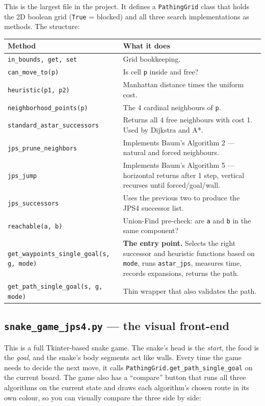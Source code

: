 \documentclass[11pt,a4paper]{article}
\begin{document}
This is the largest file in the project. It defines a \texttt{PathingGrid} class that holds the 2D boolean grid (\texttt{True} = blocked) and all three search implementations as methods. The structure:

\begin{center}
\renewcommand{\arraystretch}{1.2}
\begin{tabular}{@{}lp{10cm}@{}}
\toprule
\textbf{Method} & \textbf{What it does} \\
\midrule
\texttt{in\_bounds, get, set} & Grid bookkeeping. \\
\texttt{can\_move\_to(p)} & Is cell \texttt{p} inside and free? \\
\texttt{heuristic(p1, p2)} & Manhattan distance times the uniform cost. \\
\texttt{neighborhood\_points(p)} & The 4 cardinal neighbours of \texttt{p}. \\
\texttt{standard\_astar\_successors} & Returns all 4 free neighbours with cost 1. Used by Dijkstra and A*. \\
\texttt{jps\_prune\_neighbors} & Implements Baum's Algorithm 2 --- natural and forced neighbours. \\
\texttt{jps\_jump} & Implements Baum's Algorithm 5 --- horizontal returns after 1 step, vertical recurses until forced/goal/wall. \\
\texttt{jps\_successors} & Uses the previous two to produce the JPS4 successor list. \\
\texttt{reachable(a, b)} & Union-Find pre-check: are \texttt{a} and \texttt{b} in the same component? \\
\texttt{get\_waypoints\_single\_goal(s, g, mode)} & \textbf{The entry point.} Selects the right successor and heuristic functions based on \texttt{mode}, runs \texttt{astar\_jps}, measures time, records expansions, returns the path. \\
\texttt{get\_path\_single\_goal(s, g, mode)} & Thin wrapper that also validates the path. \\
\bottomrule
\end{tabular}
\end{center}

\subsection{\texttt{snake\_game\_jps4.py} --- the visual front-end}

This is a full Tkinter-based snake game. The snake's head is the \emph{start}, the food is the \emph{goal}, and the snake's body segments act like walls. Every time the game needs to decide the next move, it calls \texttt{PathingGrid.get\_path\_single\_goal} on the current board. The game also has a ``compare'' button that runs all three algorithms on the current state and draws each algorithm's chosen route in its own colour, so you can visually compare the three side by side:
\end{document}
